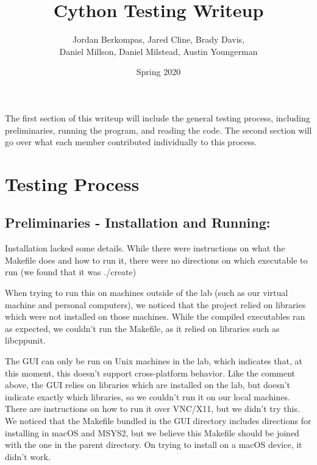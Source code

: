 \documentclass[11pt]{article}
\author{Jordan Berkompas, Jared Cline, Brady Davis, \\ Daniel Millson, Daniel Milstead, Austin Youngerman}
\date{Spring 2020}
\title{Cython Testing Writeup}
\begin{document}
\maketitle
The first section of this writeup will include the general testing process, including preliminaries, running the program, and reading the code. The second section will go over what each member contributed individually to this process.
\section*{Testing Process}
\subsection*{Preliminaries - Installation and Running:}
	Installation lacked some details. While there were instructions on what the Makefile does and how to run it, there were no directions on which executable to run (we found that it was ./create)

	When trying to run this on machines outside of the lab (such as our virtual machine and personal computers), we noticed that the project relied on libraries which were not installed on those machines. While the compiled executables ran as expected, we couldn't run the Makefile, as it relied on libraries such as libcppunit.

	The GUI can only be run on Unix machines in the lab, which indicates that, at this moment, this doesn't support cross-platform behavior. Like the comment above, the GUI relies on libraries which are installed on the lab, but doesn't indicate exactly which libraries, so we couldn't run it on our local machines. There are instructions on how to run it over VNC/X11, but we didn't try this. We noticed that the Makefile bundled in the GUI directory includes directions for installing in macOS and MSYS2, but we believe this Makefile should be joined with the one in the parent directory. On trying to install on a macOS device, it didn't work. 
\end{document}
